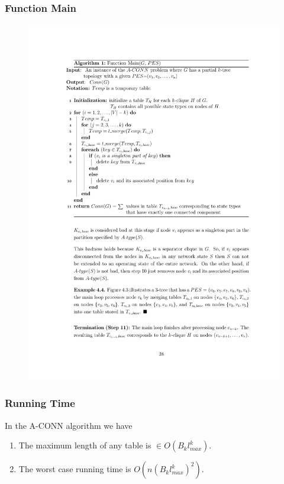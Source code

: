 \documentclass{beamer}
\newcommand{\ACONN}   { {\mathrm {A\mbox{-}CONN}} }
\begin{document}
\begin{frame}
\frametitle{Function Main}
\vspace{-1.1em}
\begin{figure}[htbp]
\centering
\includegraphics[width=3.8 in, height=3.2 in]{Fmain.pdf}
\end{figure}
\end{frame}

\begin{frame}
\frametitle{Running Time}
\begin{center}
\begin{theorem}\label{thm:runtym}
\normalfont
In the $\ACONN$ algorithm we have
\begin{enumerate}
\item The maximum length of any table is $\in O(B_k l_{max}^k)$.
\item The worst case running time is $O(n(B_k l_{max}^k)^2)$.
\end{enumerate}
\end{theorem}
\end{center}
\end{frame}
%
%
\end{document}
